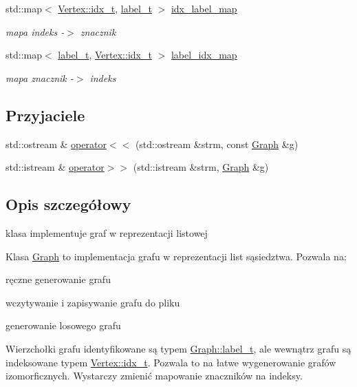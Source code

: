 \begin{DoxyCompactItemize}
std\-::map$<$ \hyperlink{classVertex_a12fe2194264f72b70b284bba723052c1}{Vertex\-::idx\-\_\-t}, \hyperlink{classGraph_a2237a0ada8484c37b8200c0e3685ca71}{label\-\_\-t} $>$ \hyperlink{classGraph_a6472b8bfc461dc9081b609b28e27d2b0}{idx\-\_\-label\-\_\-map}
\begin{DoxyCompactList}\small\item\em mapa indeks -\/$>$ znacznik \end{DoxyCompactList}\item 
std\-::map$<$ \hyperlink{classGraph_a2237a0ada8484c37b8200c0e3685ca71}{label\-\_\-t}, \hyperlink{classVertex_a12fe2194264f72b70b284bba723052c1}{Vertex\-::idx\-\_\-t} $>$ \hyperlink{classGraph_ac2083a954ecbb76a242deed60755fd07}{label\-\_\-idx\-\_\-map}
\begin{DoxyCompactList}\small\item\em mapa znacznik -\/$>$ indeks \end{DoxyCompactList}\end{DoxyCompactItemize}
\subsection*{Przyjaciele}
\begin{DoxyCompactItemize}
\item 
std\-::ostream \& \hyperlink{classGraph_a8aff7513bde5154e374e5c7a99f38bb7}{operator$<$$<$} (std\-::ostream \&strm, const \hyperlink{classGraph}{Graph} \&g)
\item 
std\-::istream \& \hyperlink{classGraph_a694dfce5839c398362898b57184d57d5}{operator$>$$>$} (std\-::istream \&strm, \hyperlink{classGraph}{Graph} \&g)
\end{DoxyCompactItemize}


\subsection{Opis szczegółowy}
klasa implementuje graf w reprezentacji listowej 

Klasa \hyperlink{classGraph}{Graph} to implementacja grafu w reprezentacji list sąsiedztwa. Pozwala na\-:
\begin{DoxyItemize}
\item ręczne generowanie grafu
\item wczytywanie i zapisywanie grafu do pliku
\item generowanie losowego grafu
\end{DoxyItemize}

Wierzchołki grafu identyfikowane są typem \hyperlink{classGraph_a2237a0ada8484c37b8200c0e3685ca71}{Graph\-::label\-\_\-t}, ale wewnątrz grafu są indeksowane typem \hyperlink{classVertex_a12fe2194264f72b70b284bba723052c1}{Vertex\-::idx\-\_\-t}. Pozwala to na łatwe wygenerowanie grafów izomorficznych. Wystarczy zmienić mapowanie znaczników na indeksy. 

